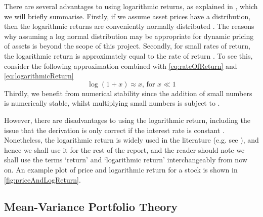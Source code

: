 There are several advantages to using logarithmic returns, as explained in \cite{QuaWp}, which we will briefly summarise.
Firstly, if we assume asset prices have a  distribution, then the logarithmic returns are conveniently normally distributed \cite{QuaWp}. The reasons why assuming a log normal distribution may be appropriate for dynamic pricing of assets is beyond the scope of this project.
Secondly, for small rates of return, the logarithmic return is approximately equal to the rate of return \cite{QuaWp}. To see this, consider the following approximation combined with \cref{eq:rateOfReturn} and \cref{eq:logarithmicReturn}
\begin{equation}
	\label{eq:logarithApproximation}
	\log(1 + x) \approx x \text{, for } x \ll 1
\end{equation}
Thirdly, we benefit from numerical stability since the addition of small numbers is numerically stable, whilst multiplying small numbers is subject to  \cite{QuaWp}.

However, there are disadvantages to using the logarithmic return, including the issue that the derivation is only correct if the interest rate is constant \cite{QuaWp,Onn02}.
Nonetheless, the logarithmic return is widely used in the literature (e.g. see \cite{Onn02,OCK+02,OKK03,FPM+10,FPW+11,MG13}), and hence we shall use it for the rest of the report, and the reader should note we shall use the terms `return' and `logarithmic return' interchangeably from now on. An example plot of price and logarithmic return for a stock is shown in \cref{fig:priceAndLogReturn}.


\subsection{Mean-Variance Portfolio Theory}
\label{subsec:portfolioTheoryBackground}

